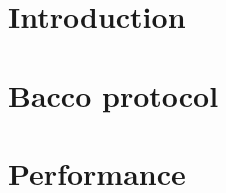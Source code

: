 \thispagestyle{empty} %
\cleardoublepage

\thispagestyle{empty}

\clearpage{\pagestyle{plain}\cleardoublepage}


\printunsrtglossaries

\clearpage{\pagestyle{plain}\cleardoublepage}
\tableofcontents

\clearpage{\pagestyle{plain}\cleardoublepage}

\chapter{Introduction}
\label{chapter:introduction}


%

%

\chapter{Bacco protocol}
\label{chapter:protocol}



\chapter{Performance}
\label{chapter:performance}


%

%
\nocite{*}
\printbibliography






